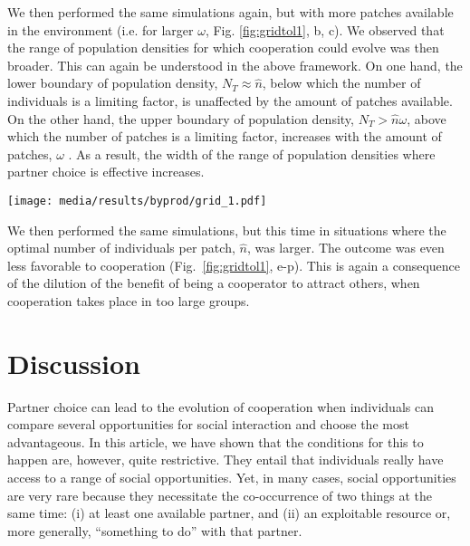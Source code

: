 \documentclass[twocolumn]{article}
\begin{document}
We then performed the same simulations again, but with more patches available in the environment (i.e. for larger $\omega$, Fig. \ref{fig:gridtol1}, b, c). We observed that the range of population densities for which cooperation could evolve was then broader. This can again be understood in the above framework. On one hand, the lower boundary of population density, $N_T \approx \hat{n}$, below which the number of individuals is a limiting factor, is unaffected by the amount of patches available.  On the other hand, the upper boundary of population density, $N_T > \hat{n}\omega$, above which the number of patches is a limiting factor, increases with the amount of patches, $\omega$ . As a result, the width of the range of population densities where partner choice is effective increases.

\begin{figure*}
    \centering
    \texttt{[image: media/results/byprod/grid\_1.pdf]}
    \caption{Effect on the population size in the environment with 20, 40 or 80 patches and an optimal number ofagents $\hat{n} = 2, 3$ and $\sigma = 1$. Agents have a cooperative behaviour for $\hat{n} < N_T < \omega\times \hat{n}$ and for $\hat{n} = 2$.}
    \label{fig:gridtol1}
\end{figure*}

We then performed the same simulations, but this time in situations where the optimal number of individuals per patch, $\hat{n}$, was larger. The outcome was even less favorable to cooperation (Fig.~\ref{fig:gridtol1}, e-p). This is again a consequence of the dilution of the benefit of being a cooperator to attract others, when cooperation takes place in too large groups.

\section{Discussion}

Partner choice can lead to the evolution of cooperation when individuals can compare several opportunities for social interaction and choose the most advantageous. In this article, we have shown that the conditions for this to happen are, however, quite restrictive. They entail  that individuals really have access to a range of social opportunities. Yet, in many cases, social opportunities are very rare because they necessitate the co-occurrence of two things at the same time: (i) at least one available partner, and (ii) an exploitable resource or, more generally, ``something to do'' with that partner. 
\end{document}
